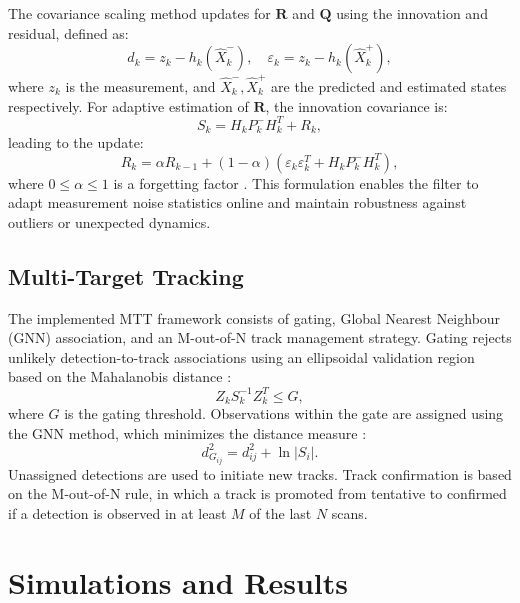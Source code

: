 \documentclass[conference]{IEEEtran}
\begin{document}
The covariance scaling method updates for $\mathbf{R}$ and $\mathbf{Q}$ using the innovation and residual, defined as:
\begin{equation}
  d_k = z_k - h_k(\hat{X}^-_k), \quad \varepsilon_k = z_k - h_k(\hat{X}^+_k),
\end{equation}
where $z_k$ is the measurement, and $\hat{X}^-_k, \hat{X}^+_k$ are the predicted and estimated states respectively. For adaptive estimation of $\mathbf{R}$, the innovation covariance is:
\begin{equation}
  S_k = H_k P^-_k H_k^T + R_k,
\end{equation}
leading to the update:
\begin{equation}
  R_k = \alpha R_{k-1} + (1-\alpha)(\varepsilon_k \varepsilon_k^T + H_k P^-_k H_k^T),
\end{equation}
where $0 \leq \alpha \leq 1$ is a forgetting factor \cite{Akhlaghi2018}. This formulation enables the filter to adapt measurement noise statistics online and maintain robustness against outliers or unexpected dynamics.

\subsection{Multi-Target Tracking}

The implemented MTT framework consists of gating, Global Nearest Neighbour (GNN) association, and an M-out-of-N track management strategy. Gating rejects unlikely detection-to-track associations using an ellipsoidal validation region based on the Mahalanobis distance \cite{Jerrelind2020, Richards2010}:
\begin{equation}
  Z_k S_k^{-1} Z_k^T \leq G,
\end{equation}
where $G$ is the gating threshold. Observations within the gate are assigned using the GNN method, which minimizes the distance measure \cite{Konstantinova2003}:
\begin{equation}
  d^2_{G_{ij}} = d^2_{ij} + \ln|S_i|.
\end{equation}
Unassigned detections are used to initiate new tracks. Track confirmation is based on the M-out-of-N rule, in which a track is promoted from tentative to confirmed if a detection is observed in at least $M$ of the last $N$ scans.

\section{Simulations and Results}
\end{document}
